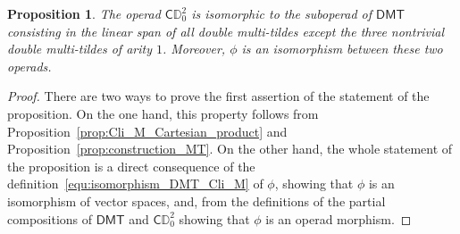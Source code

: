 \documentclass[10pt,reqno]{amsart}
\numberwithin{equation}{subsection}
\newtheorem{Proposition}[Theorem]{Proposition}
\newcommand{\Dbb}{\mathbb{D}}
\newcommand{\Cli}{\mathsf{C}}
\newcommand{\DMT}{\mathsf{DMT}}
\begin{document}
\begin{Proposition} \label{prop:construction_DMT}
    The operad $\Cli\Dbb_0^2$ is isomorphic to the suboperad of $\DMT$
    consisting in the linear span of all double multi-tildes except the
    three nontrivial double multi-tildes of arity $1$. Moreover, $\phi$
    is an isomorphism between these two operads.
\end{Proposition}
\begin{proof}
    There are two ways to prove the first assertion of the statement of
    the proposition. On the one hand, this property follows from
    Proposition~\ref{prop:Cli_M_Cartesian_product} and
    Proposition~\ref{prop:construction_MT}. On the other hand, the whole
    statement of the proposition is a direct consequence of the
    definition~\eqref{equ:isomorphism_DMT_Cli_M} of $\phi$, showing that
    $\phi$ is an isomorphism of vector spaces, and, from the definitions
    of the partial compositions of $\DMT$ and $\Cli\Dbb_0^2$ showing
    that $\phi$ is an operad morphism.
\end{proof}
\medskip
\end{document}
